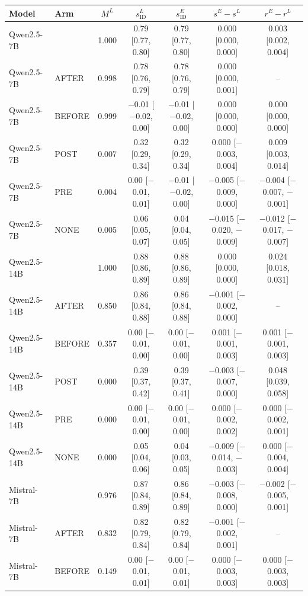 \begin{tabular}{llccccc}
\toprule
Model & Arm & $M^L$ & $s^L_{\mathrm{ID}}$ & $s^E_{\mathrm{ID}}$ & $s^E - s^L$ & $r^E - r^L$ \\
\midrule
Qwen2.5-7B & \fmtOpt{} & 1.000 & 0.79 [0.77, 0.80] & 0.79 [0.77, 0.80] & 0.000 [0.000, 0.000] & 0.003 [0.002, 0.004] \\
Qwen2.5-7B & AFTER & 0.998 & 0.78 [0.76, 0.79] & 0.78 [0.76, 0.79] & 0.000 [0.000, 0.001] & -- \\
Qwen2.5-7B & BEFORE & 0.999 & $-$0.01 [$-$0.02, 0.00] & $-$0.01 [$-$0.02, 0.00] & 0.000 [0.000, 0.000] & 0.000 [0.000, 0.000] \\
Qwen2.5-7B & POST & 0.007 & 0.32 [0.29, 0.34] & 0.32 [0.29, 0.34] & 0.000 [$-$0.003, 0.004] & 0.009 [0.003, 0.014] \\
Qwen2.5-7B & PRE & 0.004 & 0.00 [$-$0.01, 0.01] & $-$0.01 [$-$0.02, 0.00] & $-$0.005 [$-$0.009, 0.000] & $-$0.004 [$-$0.007, $-$0.001] \\
Qwen2.5-7B & NONE & 0.005 & 0.06 [0.05, 0.07] & 0.04 [0.04, 0.05] & $-$0.015 [$-$0.020, $-$0.009] & $-$0.012 [$-$0.017, $-$0.007] \\
Qwen2.5-14B & \fmtOpt{} & 1.000 & 0.88 [0.86, 0.89] & 0.88 [0.86, 0.89] & 0.000 [0.000, 0.000] & 0.024 [0.018, 0.031] \\
Qwen2.5-14B & AFTER & 0.850 & 0.86 [0.84, 0.88] & 0.86 [0.84, 0.88] & $-$0.001 [$-$0.002, 0.000] & -- \\
Qwen2.5-14B & BEFORE & 0.357 & 0.00 [$-$0.01, 0.00] & 0.00 [$-$0.01, 0.00] & 0.001 [$-$0.001, 0.003] & 0.001 [$-$0.001, 0.003] \\
Qwen2.5-14B & POST & 0.000 & 0.39 [0.37, 0.42] & 0.39 [0.37, 0.41] & $-$0.003 [$-$0.007, 0.000] & 0.048 [0.039, 0.058] \\
Qwen2.5-14B & PRE & 0.000 & 0.00 [$-$0.01, 0.00] & 0.00 [$-$0.01, 0.00] & 0.000 [$-$0.002, 0.002] & 0.000 [$-$0.002, 0.001] \\
Qwen2.5-14B & NONE & 0.000 & 0.05 [0.04, 0.06] & 0.04 [0.03, 0.05] & $-$0.009 [$-$0.014, $-$0.003] & 0.000 [$-$0.004, 0.004] \\
Mistral-7B & \fmtOpt{} & 0.976 & 0.87 [0.84, 0.89] & 0.86 [0.84, 0.89] & $-$0.003 [$-$0.008, 0.000] & $-$0.002 [$-$0.005, 0.001] \\
Mistral-7B & AFTER & 0.832 & 0.82 [0.79, 0.84] & 0.82 [0.79, 0.84] & $-$0.001 [$-$0.002, 0.001] & -- \\
Mistral-7B & BEFORE & 0.149 & 0.00 [$-$0.01, 0.01] & 0.00 [$-$0.01, 0.01] & 0.000 [$-$0.003, 0.003] & 0.000 [$-$0.003, 0.003] \\

\end{tabular}
